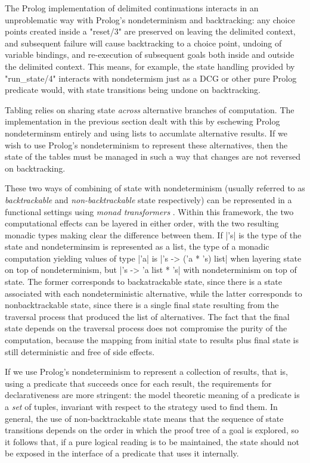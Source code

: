 The Prolog implementation of delimited continuations interacts in an unproblematic way
with Prolog's nondeterminism and backtracking: any choice points created inside a
"reset/3" are preserved on leaving the delimited context, and subsequent failure will
cause backtracking to a choice point, undoing of variable bindings, and re-execution of 
subsequent goals both inside and outside the delimited context. This means, for example,
the state handling provided by "run_state/4" interacts with nondetermism just as
a DCG or other pure Prolog predicate would, with state transitions being undone on backtracking.

Tabling relies on sharing state \emph{across} alternative branches of computation.
The implementation in the previous section dealt with this by eschewing Prolog nondeterminsm
entirely and using lists to accumlate alternative results.
If we wish to use Prolog's nondeterminism to represent these alternatives, then
the state of the tables must be managed in such a way that changes are not reversed on backtracking.

These two ways of combining of state with nondeterminism (usually referred to as \emph{backtrackable}
and \emph{non-backtrackable} state respectively) can be represented
in a functional settings using \emph{monad transformers} \citep{LiangHudakJones1995}.
Within this framework, the two computational effects can be
layered in either order, with the two resulting monadic types making clear the difference
between them. If |'s| is the type of the state and nondeterminsim is represented as a list,
the type of a monadic computation yielding values of type |'a| is |'s -> ('a * 's) list| 
when layering state on top of nondeterminism, but
|'s -> 'a list * 's| with nondeterminism on top of state. The former corresponds to backatrackable 
state, since there is a state associated with each nondeterministic alternative, while the
latter corresponds to nonbacktrackable state, since there is a single final state resulting from
the traversal process that produced the list of alternatives. The fact that the final state depends
on the traversal process does not compromise the purity of the computation, because the mapping
from initial state to results plus final state is still deterministic and free of side effects.

If we use Prolog's nondeterminism to represent a collection of results, that is, using a predicate
that succeeds once for each result, the
requirements for declarativeness are more stringent: the model theoretic meaning of a predicate is
a \emph{set} of tuples, invariant with respect to the strategy used to find them.
In general, the use of non-backtrackable state means that the sequence of state transitions depends
on the order in which the proof tree of a goal is explored, so it follows that, if a pure logical
reading is to be maintained, the state
should not be exposed in the interface of a predicate that uses it internally.

